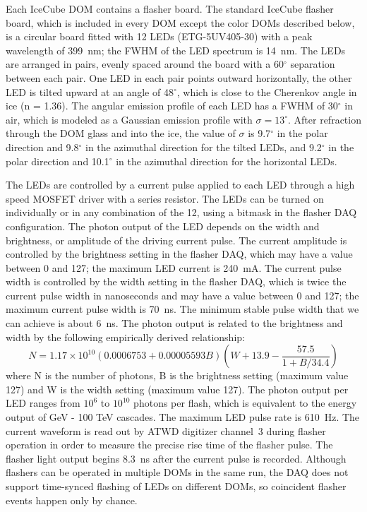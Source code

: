 Each IceCube DOM contains a flasher board. The standard IceCube
flasher board, which is included in every DOM except the color DOMs
described below, is a circular board fitted with 12 LEDs (ETG-5UV405-30) with a peak
wavelength of 399~nm; the FWHM of the LED spectrum is
14~nm. The LEDs are arranged in pairs, evenly spaced around the board
with a 60$^{\circ}$ separation between each pair. One LED in each pair
points outward horizontally, the other LED is tilted upward at an angle
of 48$^{\circ}$, which is close to the Cherenkov angle in ice (n =
1.36). The angular emission profile of each LED has a FWHM of
30$^{\circ}$ in air, which is modeled as a Gaussian emission profile
with $\sigma = 13^{\circ}$. After refraction through the DOM glass and into
the ice, the value of $\sigma$ is 9.7$^{\circ}$ in the polar direction
and 9.8$^{\circ}$ in the azimuthal direction for the tilted LEDs, and  9.2$^{\circ}$ in the polar direction
and 10.1$^{\circ}$ in the azimuthal direction for the horizontal LEDs.

The LEDs are controlled by a current pulse applied to each LED through
a high speed MOSFET driver with a series resistor. The LEDs can be turned on individually or in any
combination of the 12, using a bitmask in the flasher DAQ
configuration. The photon output of the LED depends on the width and
brightness, or
amplitude of
the driving current pulse. The current amplitude is controlled by the
brightness setting in the flasher DAQ, which may have a value between
0 and 127; the maximum LED
current is 240~mA. The current pulse width is controlled by the width
setting in the flasher DAQ, which is twice the current pulse width in
nanoseconds and may have a value between 0 and 127; the maximum current pulse width is 70~ns. The
minimum stable pulse width that we can achieve is about 6~ns. The
photon output is related to the brightness  and width by the following
empirically derived relationship:
\begin{equation}
N = 1.17 \times 10^{10} \left (0.0006753 + 0.00005593B \right ) \left
  (W + 13.9 - \frac{57.5}{1 + B/34.4} \right )
\end{equation}
where N is the number of photons, B is the brightness setting (maximum
value 127) and W is the width setting (maximum value 127). The photon
output per LED ranges from $10^6$ to $10^{10}$ photons per flash,
which is equivalent to the energy output of GeV - 100 TeV cascades. The maximum
LED pulse rate is 610~Hz. The current waveform is read out by ATWD
digitizer channel~3 during flasher operation in order to measure the
precise rise time of the flasher pulse. The flasher light output
begins 8.3~ns after the current pulse is recorded. Although flashers can be
operated in multiple DOMs in the same run, the DAQ does not support
time-synced flashing of LEDs on different DOMs, so coincident flasher
events happen only by chance. 

